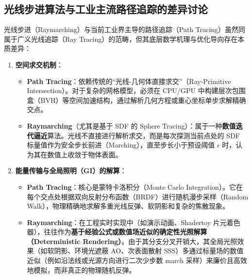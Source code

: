 \documentclass[11pt, a4paper, oneside]{report}
\begin{document}
\subsection{光线步进算法与工业主流路径追踪的差异讨论}
光线步进（Raymarching）与当前工业界主导的路径追踪（Path Tracing）虽然同属于广义光线追踪（Ray Tracing）的范畴，但其底层数学机理与优化导向存在本质差异：
\begin{enumerate}
    \item \textbf{空间求交机制}：
    \begin{itemize}
        \item \textbf{Path Tracing}：依赖传统的“光线-几何体直接求交”（Ray-Primitive Intersection）。对于复杂的网格模型，必须在 CPU/GPU 中构建层次包围盒（BVH）等空间加速结构，通过解析几何方程或重心坐标单步求解精确交点。
        \item \textbf{Raymarching}（尤其是基于 SDF 的 Sphere Tracing）：属于一种\textbf{数值迭代逼近}算法。光线不直接进行解析求交，而是每次探测当前点处的 SDF 标量值作为安全步长前进（Marching），直至步长小于预设阈值 $\epsilon$ 时，认为其在数值上收敛于物体表面。
    \end{itemize}
    \item \textbf{能量传输与全局照明（GI）的解算}：
    \begin{itemize}
        \item \textbf{Path Tracing}：核心是蒙特卡洛积分（Monte Carlo Integration）。它在每个交点处根据双向反射分布函数（BRDF）进行随机漫步采样（Random Walk），物理精确地求解多重光线反弹、软阴影和复杂的焦散现象。
        \item \textbf{Raymarching}：在工程实时实现中（如演示动画、Shadertoy 片元着色器），往往作为\textbf{基于经验公式或数值场近似的确定性光照解算（Deterministic Rendering）}。由于其分支分叉开销大，其全局光照效果（如软阴影、环境光遮蔽 AO、次表面散射 SSS）多通过标量场的数值近似（例如沿法线或光源方向进行二次少步数 march 采样）来廉价且高效地模拟，而非真正的物理随机反弹。
    \end{itemize}
\end{enumerate}
\end{document}
